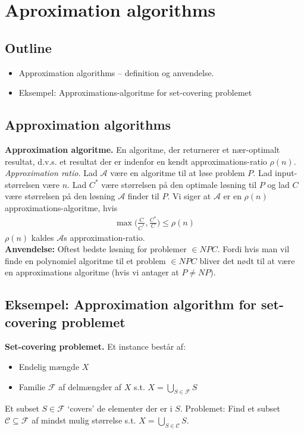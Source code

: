 \section{Aproximation algorithms}

\subsection*{Outline}

\begin{itemize}
	\item Approximation algorithms -- definition og anvendelse.
	\item Eksempel: Approximations-algoritme for set-covering problemet
\end{itemize}

\subsection*{Approximation algorithms}
\textbf{Approximation algoritme.} En algoritme, der returnerer et nær-optimalt resultat, d.v.s. et resultat der er indenfor en kendt approximations-ratio $\rho(n)$. \\

\textit{Approximation ratio.} Lad $\mathcal{A}$ være en algoritme til at løse problem $P$. Lad input-størrelsen være $n$. Lad $C^*$ være størrelsen på den optimale løsning til $P$ og lad $C$ være størrelsen på den løsning $\mathcal{A}$ finder til $P$. Vi siger at $\mathcal{A}$ er en $\rho(n)$ approximations-algoritme, hvis 
\begin{align*}
	\max \bigg( \frac{C}{C^*}, \frac{C^*}{C} \bigg) \le \rho(n)
\end{align*}
$\rho(n)$ kaldes $\mathcal{A}$s approximation-ratio. \\

\textbf{Anvendelse:} Oftest bedste løsning for problemer $\in NPC$. Fordi hvis man vil finde en polynomiel algoritme til et problem $\in NPC$ bliver det nødt til at være en approximations algoritme (hvis vi antager at $P \ne NP$). 

\subsection*{Eksempel: Approximation algorithm for set-covering problemet}

\textbf{Set-covering problemet.} Et instance består af: 
\begin{itemize}
	\item Endelig mængde $X$
	\item Familie $\mathcal{F}$ af delmængder af $X$ s.t. $X=\bigcup_{S \in \mathcal{F}} S$
\end{itemize}
Et subset $S \in \mathcal{F}$ `covers' de elementer der er i $S$. Problemet: Find et subset $\mathcal{C} \subseteq \mathcal{F}$ af mindst mulig størrelse s.t. $X=\bigcup_{S \in \mathcal{C}} S$. \\

